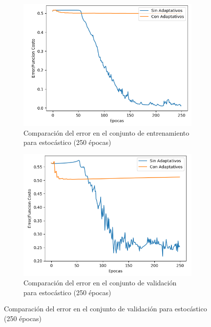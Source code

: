 \begin{figure}[!htbp]
\centering
\begin{subfigure}{.5\textwidth}
  \centering
  \includegraphics[width=1\linewidth]{graficos/adaptativos_promedios_entrenamiento.png}
  \caption{Comparación del error en el conjunto de entrenamiento para estocástico (250 épocas)}
  \label{fig:sub1}
\end{subfigure}%
\begin{subfigure}{.5\textwidth}
  \centering
  \includegraphics[width=1\linewidth]{graficos/adaptativos_promedios_validacion.png}
  \caption{Comparación del error en el conjunto de validación para estocástico (250 épocas)}
  \label{fig:sub2}
\end{subfigure}
\end{figure}

